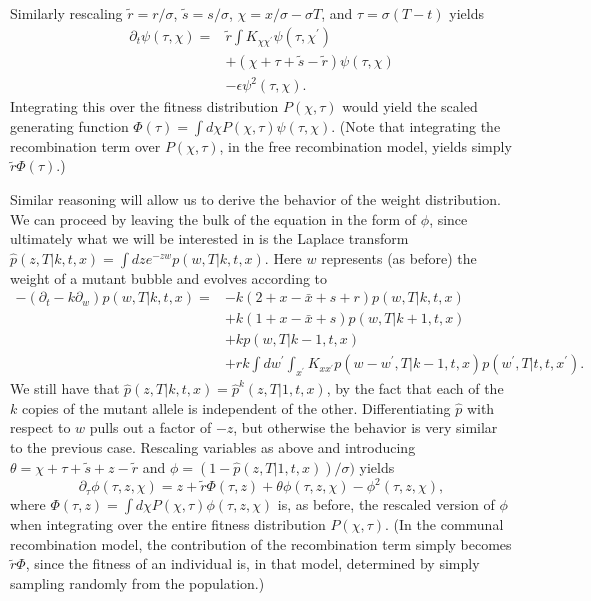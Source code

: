 \documentclass[10pt]{revtex4}
\begin{document}
Similarly rescaling $\tilde{r} = r/\sigma$, $\tilde{s} = s/\sigma$, $\chi = x/\sigma - \sigma T$, and $\tau = \sigma(T-t)$ yields
\begin{align*}
\partial_t \psi(\tau,\chi) = &\tilde{r}\int K_{\chi \chi^\prime} \psi (\tau, \chi^\prime) \\
& + (\chi + \tau + \tilde{s} - \tilde{r}) \psi (\tau,\chi) \\
& - \epsilon \psi^2 (\tau,\chi).
\end{align*}
Integrating this over the fitness distribution $P(\chi,\tau)$ would yield the scaled generating function $\Phi(\tau) = \int d\chi P(\chi,\tau)\psi(\tau,\chi)$.
(Note that integrating the recombination term over $P(\chi,\tau)$, in the free recombination model, yields simply $\tilde{r}\Phi(\tau)$.)

Similar reasoning will allow us to derive the behavior of the weight distribution.
We can proceed by leaving the bulk of the equation in the form of $\phi$, since ultimately what we will be interested in is the Laplace transform $\hat{p} (z,T|k,t,x) = \int dz e^{-zw} p(w,T|k,t,x)$.
Here $w$ represents (as before) the weight of a mutant bubble and evolves according to
\begin{align*}
-(\partial_t -k\partial_w) p(w,T|k,t,x) = &-k(2+x-\bar{x}+s+r)p(w,T|k,t,x) \\
& + k(1+x-\bar{x}+s)p(w,T|k+1,t,x) \\
& +kp(w,T|k-1,t,x) \\
&+rk \int dw^\prime \int_{x^\prime} K_{x x^\prime} p(w-w^\prime , T|k-1, t, x) p(w^\prime,T|t,t,x^\prime).
\end{align*}
We still have that $\hat{p} (z,T|k,t,x) = \hat{p}^k (z,T|1,t,x)$, by the fact that each of the $k$ copies of the mutant allele is independent of the other.
Differentiating $\hat{p}$ with respect to $w$ pulls out a factor of $-z$, but otherwise the behavior is very similar to the previous case.
Rescaling variables as above and introducing $\theta = \chi+\tau+\tilde{s}+z-\tilde{r}$ and $\phi = (1-\hat{p}(z,T|1,t,x))/\sigma)$ yields
\begin{equation}
\partial_\tau \phi(\tau,z,\chi) = z + \tilde{r} \Phi(\tau, z) + \theta \phi(\tau,z,\chi) - \phi^2(\tau,z,\chi),
\end{equation}
where $\Phi(\tau, z) = \int d\chi P(\chi, \tau) \phi(\tau, z, \chi)$ is, as before, the rescaled version of $\phi$ when integrating over the entire fitness distribution $P(\chi, \tau)$.
(In the communal recombination model, the contribution of the recombination term simply becomes $\tilde{r}\Phi$, since the fitness of an individual is, in that model, determined by simply sampling randomly from the population.)
\end{document}
